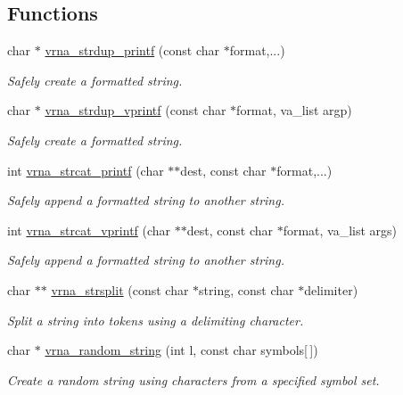 \subsection*{Functions}
\begin{DoxyCompactItemize}
\item 
char $\ast$ \hyperlink{group__string__utils_ga33cc0190a326ec368277caa777b8bf18}{vrna\+\_\+strdup\+\_\+printf} (const char $\ast$format,...)
\begin{DoxyCompactList}\small\item\em Safely create a formatted string. \end{DoxyCompactList}\item 
char $\ast$ \hyperlink{group__string__utils_ga459fdee190ed81bb7773cbaf671748a9}{vrna\+\_\+strdup\+\_\+vprintf} (const char $\ast$format, va\+\_\+list argp)
\begin{DoxyCompactList}\small\item\em Safely create a formatted string. \end{DoxyCompactList}\item 
int \hyperlink{group__string__utils_gac0771ec71316023067f2aae61a5aa0fb}{vrna\+\_\+strcat\+\_\+printf} (char $\ast$$\ast$dest, const char $\ast$format,...)
\begin{DoxyCompactList}\small\item\em Safely append a formatted string to another string. \end{DoxyCompactList}\item 
int \hyperlink{group__string__utils_ga122df216996ba62fd5056b7743e3131a}{vrna\+\_\+strcat\+\_\+vprintf} (char $\ast$$\ast$dest, const char $\ast$format, va\+\_\+list args)
\begin{DoxyCompactList}\small\item\em Safely append a formatted string to another string. \end{DoxyCompactList}\item 
char $\ast$$\ast$ \hyperlink{group__string__utils_gac632775617f4b2df096bfe8efb53d07f}{vrna\+\_\+strsplit} (const char $\ast$string, const char $\ast$delimiter)
\begin{DoxyCompactList}\small\item\em Split a string into tokens using a delimiting character. \end{DoxyCompactList}\item 
char $\ast$ \hyperlink{group__string__utils_ga4eeb3750dcf860b9f3158249f95dbd7f}{vrna\+\_\+random\+\_\+string} (int l, const char symbols\mbox{[}$\,$\mbox{]})
\begin{DoxyCompactList}\small\item\em Create a random string using characters from a specified symbol set. \end{DoxyCompactList}\item 
$$
\end{DoxyCompactItemize}
